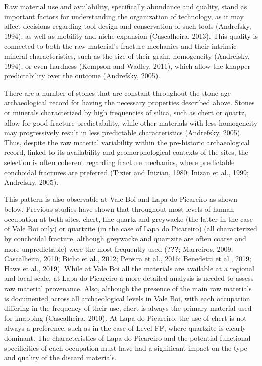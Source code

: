 \documentclass[12pt,twoside]{reedthesis}
\begin{document}
Raw material use and availability, specifically abundance and quality, stand as important factors for understanding the organization of technology, as it may affect decisions regarding tool design and conservation of such tools (Andrefsky, 1994), as well as mobility and niche expansion (Cascalheira, 2013). This quality is connected to both the raw material's fracture mechanics and their intrinsic mineral characteristics, such as the size of their grain, homogeneity (Andrefsky, 1994), or even hardness (Kempson and Wadley, 2011), which allow the knapper predictability over the outcome (Andrefsky, 2005).

There are a number of stones that are constant throughout the stone age archaeological record for having the necessary properties described above. Stones or minerals characterized by high frequencies of silica, such as chert or quartz, allow for good fracture predictability, while other materials with less homogeneity may progressively result in less predictable characteristics (Andrefsky, 2005). Thus, despite the raw material variability within the pre-historic archaeological record, linked to its availability and geomorphological contexts of the sites, the selection is often coherent regarding fracture mechanics, where predictable conchoidal fractures are preferred (Tixier and Inizian, 1980; Inizan et al., 1999; Andrefsky, 2005).

This pattern is also observable at Vale Boi and Lapa do Picareiro as shown below. Previous studies have shown that throughout most levels of human occupation at both sites, chert, fine quartz and greywacke (the latter in the case of Vale Boi only) or quartzite (in the case of Lapa do Picareiro) (all characterized by conchoidal fracture, although greywacke and quartzite are often coarse and more unpredictable) were the most frequently used ({\textbf{???}}; Marreiros, 2009; Cascalheira, 2010; Bicho et al., 2012; Pereira et al., 2016; Benedetti et al., 2019; Haws et al., 2019). While at Vale Boi all the materials are available at a regional and local scale, at Lapa do Picareiro a more detailed analysis is needed to assess raw material provenance. Also, although the presence of the main raw materials is documented across all archaeological levels in Vale Boi, with each occupation differing in the frequency of their use, chert is always the primary material used for knapping (Cascalheira, 2010). At Lapa do Picareiro, the use of chert is not always a preference, such as in the case of Level FF, where quartzite is clearly dominant. The characteristics of Lapa do Picareiro and the potential functional specificities of each occupation must have had a significant impact on the type and quality of the discard materials.
\end{document}
